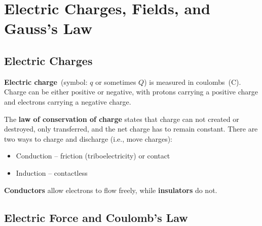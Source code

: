 \chapter{Electric Charges, Fields, and Gauss's Law}

\section{Electric Charges} \label{sec:electric-charges}

\textbf{Electric charge}~(symbol: \(q\) or sometimes \(Q\))
is measured in coulombs~(\unit{\coulomb}).
Charge can be either positive or negative,
with protons carrying a positive charge and electrons carrying a
negative charge.

The \textbf{law of conservation of  charge} states
that charge can not created or destroyed, only transferred,
and the net charge has to remain constant.
There are two ways to charge and discharge (i.e., move charges):
\begin{itemize}
    \item Conduction -- friction (triboelectricity) or contact
    \item Induction -- contactless
\end{itemize}

\textbf{Conductors} allow electrons to flow freely,
while \textbf{insulators} do not.
\vfil

\section{Electric Force and Coulomb's Law}

